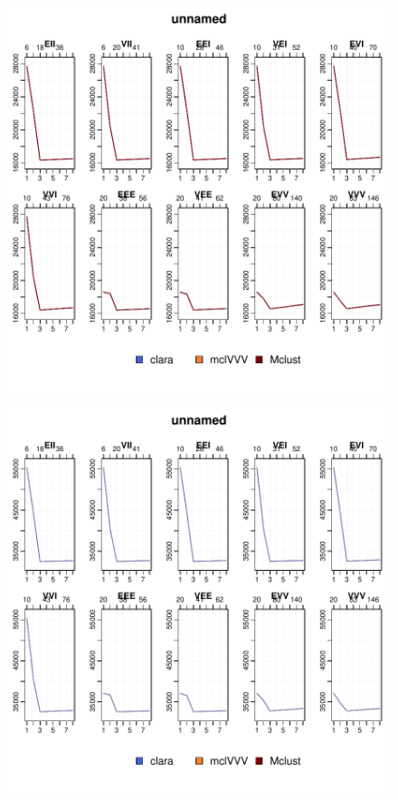 \begin{figure}[h]
\begin{minipage}{0.45\textwidth}
\includegraphics{App_plots-fig10fit}
    \end{minipage}
\end{figure}

\begin{figure}
    \centering
\includegraphics{App_plots-fig20fit}
\end{figure}


